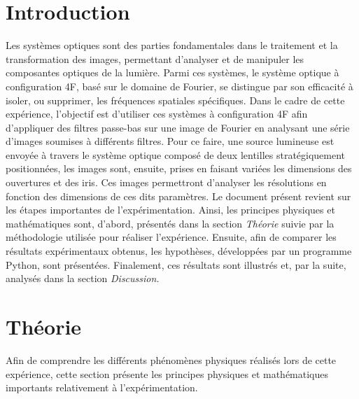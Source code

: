 \documentclass[11pt,letterpaper]{article}
\begin{document}
\section{Introduction}
Les systèmes optiques sont des parties fondamentales dans le traitement et la transformation des images, permettant d'analyser et de manipuler les composantes optiques de la lumière. Parmi ces systèmes, le système optique à configuration 4F, basé sur le domaine de Fourier, se distingue par son efficacité à isoler, ou supprimer, les fréquences spatiales spécifiques. Dans le cadre de cette expérience, l'objectif est d'utiliser ces systèmes à configuration 4F afin d'appliquer des filtres passe-bas sur une image de Fourier en analysant une série d'images soumises à différents filtres. Pour ce faire, une source lumineuse est envoyée à travers le système optique composé de deux lentilles stratégiquement positionnées, les images sont, ensuite, prises en faisant variées les dimensions des ouvertures et des iris. Ces images permettront d'analyser les résolutions en fonction des dimensions de ces dits paramètres. Le document présent revient sur les étapes importantes de l'expérimentation. Ainsi, les principes physiques et mathématiques sont, d'abord, présentés dans la section \textit{Théorie} suivie par la méthodologie utilisée pour réaliser l'expérience. Ensuite, afin de comparer les résultats expérimentaux obtenus, les hypothèses, développées par un programme Python, sont présentées. Finalement, ces résultats sont illustrés et, par la suite, analysés dans la section \textit{Discussion.}

\section{Théorie}
Afin de comprendre les différents phénomènes physiques réalisés lors de cette expérience, cette section présente les principes physiques et mathématiques importants relativement à l'expérimentation.
\end{document}
